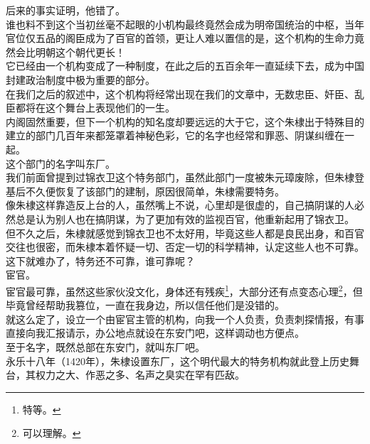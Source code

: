 \begin{multicols}{\theparacolNo}
后来的事实证明，他错了。\\

谁也料不到这个当初丝毫不起眼的小机构最终竟然会成为明帝国统治的中枢，当年官位仅五品的阁臣成为了百官的首领，更让人难以置信的是，这个机构的生命力竟然会比明朝这个朝代更长！\\

它已经由一个机构变成了一种制度，在此之后的五百余年一直延续下去，成为中国封建政治制度中极为重要的部分。\\

在我们之后的叙述中，这个机构将经常出现在我们的文章中，无数忠臣、奸臣、乱臣都将在这个舞台上表现他们的一生。\\

内阁固然重要，但下一个机构的知名度却要远远的大于它，这个朱棣出于特殊目的建立的部门几百年来都笼罩着神秘色彩，它的名字也经常和罪恶、阴谋纠缠在一起。\\

这个部门的名字叫东厂。\\

我们前面曾提到过锦衣卫这个特务部门，虽然此部门一度被朱元璋废除，但朱棣登基后不久便恢复了该部门的建制，原因很简单，朱棣需要特务。\\

像朱棣这样靠造反上台的人，虽然嘴上不说，心里却是很虚的，自己搞阴谋的人必然总是认为别人也在搞阴谋，为了更加有效的监视百官，他重新起用了锦衣卫。\\

但不久之后，朱棣就感觉到锦衣卫也不太好用，毕竟这些人都是良民出身，和百官交往也很密，而朱棣本着怀疑一切、否定一切的科学精神，认定这些人也不可靠。\\

这下就难办了，特务还不可靠，谁可靠呢？\\

宦官。\\

宦官最可靠，虽然这些家伙没文化，身体还有残疾\footnote{特等。}，大部分还有点变态心理\footnote{可以理解。}，但毕竟曾经帮助我篡位，一直在我身边，所以信任他们是没错的。\\

就这么定了，设立一个由宦官主管的机构，向我一个人负责，负责刺探情报，有事直接向我汇报请示，办公地点就设在东安门吧，这样调动也方便点。\\

至于名字，既然总部在东安门，就叫东厂吧。\\

永乐十八年（1420年），朱棣设置东厂，这个明代最大的特务机构就此登上历史舞台，其权力之大、作恶之多、名声之臭实在罕有匹敌。\\


\end{multicols}
